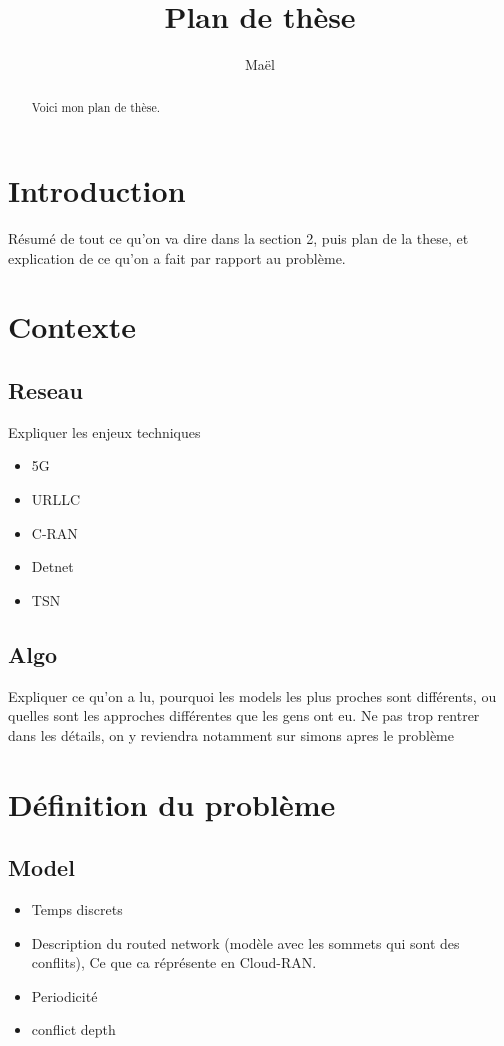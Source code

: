 \documentclass[a4paper,10pt]{article}
\title{Plan de thèse}
\author{Maël}
\begin{document}
\maketitle

\begin{abstract}
Voici mon plan de thèse.
\end{abstract}
\section{Introduction}
Résumé  de tout ce qu'on va dire dans la section 2, puis plan de la these, et explication de ce qu'on a fait par rapport au problème.

\section{Contexte}

\subsection{Reseau}
Expliquer les enjeux techniques
\begin{itemize}
 \item 5G
 \item URLLC
 \item C-RAN
 \item Detnet
 \item TSN
\end{itemize}
\subsection{Algo}
Expliquer ce qu'on a lu, pourquoi les models les plus proches sont différents, ou quelles sont les approches différentes que les gens ont eu. Ne pas trop rentrer dans les détails, on y reviendra notamment sur simons apres le problème

\section{Définition du problème}

\subsection{Model}
\begin{itemize}
 \item Temps discrets
 \item Description du routed network (modèle avec les sommets qui sont des conflits), Ce que ca réprésente en Cloud-RAN.
 \item Periodicité
 \item conflict depth
 
\end{itemize}
\end{document}
